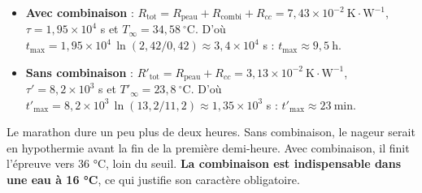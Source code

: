 \documentclass[11pt,a4paper]{article}
\providecommand{\tightlist}{\setlength{\itemsep}{0pt}\setlength{\parskip}{0pt}}
\begin{document}
\begin{itemize}
\tightlist
\item
  \textbf{Avec combinaison} : \(R_{\text{tot}} = R_{\text{peau}} + R_{\text{combi}} + R_{cc} = 7{,}43\times 10^{-2}\ \mathrm{K\cdot W^{-1}}\), \(\tau = 1{,}95\times 10^4\) s et \(T_\infty = 34{,}58\ ^\circ\)C. D'où \(t_{\text{max}} = 1{,}95\times 10^4\,\ln(2{,}42/0{,}42) \approx 3{,}4\times 10^4\) s : \(\boxed{t_{\text{max}} \approx 9{,}5\ \mathrm h}\).
\item
  \textbf{Sans combinaison} : \(R'_{\text{tot}} = R_{\text{peau}} + R_{cc} = 3{,}13\times 10^{-2}\ \mathrm{K\cdot W^{-1}}\), \(\tau' = 8{,}2\times 10^3\) s et \(T'_\infty = 23{,}8\ ^\circ\)C. D'où \(t'_{\text{max}} = 8{,}2\times 10^3\,\ln(13{,}2/11{,}2) \approx 1{,}35\times 10^3\) s : \(\boxed{t'_{\text{max}} \approx 23\ \mathrm{min}}\).
\end{itemize}

Le marathon dure un peu plus de deux heures. Sans combinaison, le nageur serait en hypothermie avant la fin de la première demi-heure. Avec combinaison, il finit l'épreuve vers 36 °C, loin du seuil. \textbf{La combinaison est indispensable dans une eau à 16 °C}, ce qui justifie son caractère obligatoire.
\end{document}
